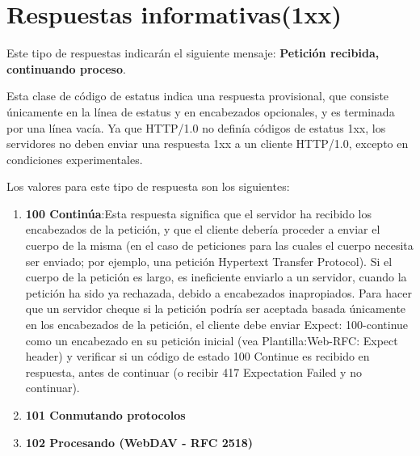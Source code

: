 \section{Respuestas informativas(1xx)}
Este tipo de respuestas indicarán el siguiente mensaje: \textbf{Petición recibida, continuando proceso}.
\bigskip
\par
Esta clase de código de estatus indica una respuesta provisional, que consiste únicamente en la línea de estatus y en encabezados opcionales, y es terminada por una línea vacía. Ya que HTTP/1.0 no definía códigos de estatus 1xx, los servidores no deben enviar una respuesta 1xx a un cliente HTTP/1.0, excepto en condiciones experimentales.
\bigskip
\par
Los valores para este tipo de respuesta son los siguientes:
\begin{enumerate}
\item \textbf{100 Continúa}:Esta respuesta significa que el servidor ha recibido los encabezados de la petición, y que el cliente debería proceder a enviar el cuerpo de la misma (en el caso de peticiones para las cuales el cuerpo necesita ser enviado; por ejemplo, una petición Hypertext Transfer Protocol). Si el cuerpo de la petición es largo, es ineficiente enviarlo a un servidor, cuando la petición ha sido ya rechazada, debido a encabezados inapropiados. Para hacer que un servidor cheque si la petición podría ser aceptada basada únicamente en los encabezados de la petición, el cliente debe enviar Expect: 100-continue como un encabezado en su petición inicial (vea Plantilla:Web-RFC: Expect header) y verificar si un código de estado 100 Continue es recibido en respuesta, antes de continuar (o recibir 417 Expectation Failed y no continuar).
\item \textbf{101 Conmutando protocolos}
\item \textbf{102 Procesando (WebDAV - RFC 2518)}
\end{enumerate}

